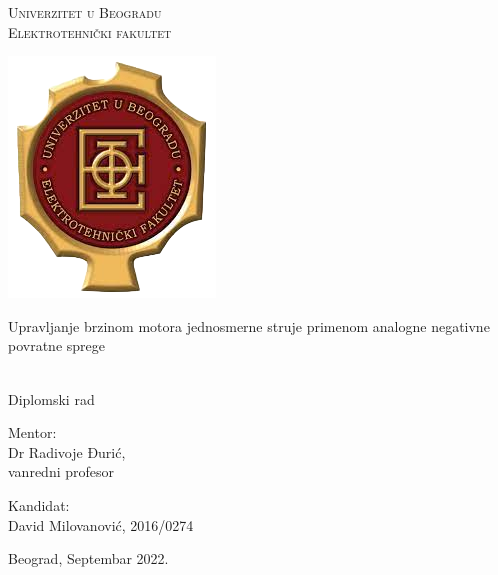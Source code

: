 \documentclass[a4paper, 12pt, diplomski]{etf}
\begin{document}


\begin{center}
    {
    \Large
    \textsc{Univerzitet u Beogradu} \\
    \textsc{Elektrotehnički fakultet} \\
	
	\vspace{22pt}    
    
    \includegraphics[scale=.5]{fig/etf_logo.png}
    
    \vfill
    
    \LARGE
    Upravljanje brzinom motora jednosmerne struje primenom analogne negativne povratne sprege
    } \\[2mm]
    {\large Diplomski rad}
    
    \vfill
    
    \large 
    
    \begin{minipage}[t]{.49\textwidth}
    \begin{flushleft}    
    Mentor:     \\
    Dr Radivoje Đurić, \\
    vanredni profesor
    \end{flushleft}
    \end{minipage}
    \begin{minipage}[t]{.49\textwidth}
    \begin{flushright}
    Kandidat: \\
    David Milovanović, 2016/0274
    \end{flushright}
    \end{minipage}

    
    \vfill
    
    Beograd, Septembar 2022.
\end{center}
\end{document}
